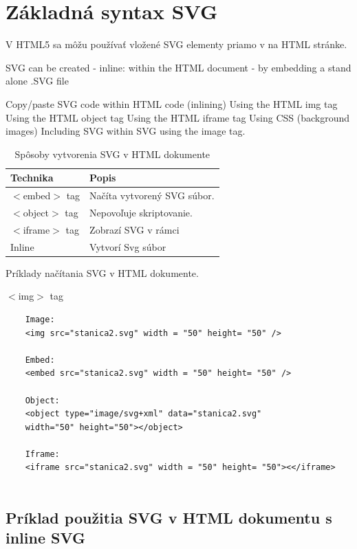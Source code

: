  
 \section{Základná syntax \acs*{SVG}}

V HTML5 sa môžu používať vložené SVG elementy priamo v na HTML stránke. 



SVG can be created 
-   inline: within the HTML document 
-   by embedding a stand alone .SVG file


Copy/paste SVG code within HTML code (inlining)
Using the HTML img tag
Using the HTML object tag
Using the HTML iframe tag
Using CSS (background images)
Including SVG within SVG using the image tag.


\begin{table}[hp]
	\begin{center}
		\begin{tabular}{|l|l|}
			\hline \textbf{Technika} & \textbf{Popis} \\ 
			\hline $<$embed$>$ tag & Načíta vytvorený SVG súbor.  \\ 
			\hline $<$object$>$ tag & Nepovoľuje skriptovanie.  \\ 
			\hline $<$iframe$>$ tag & Zobrazí SVG v rámci  \\ 
			\hline Inline & Vytvorí Svg súbor \\ 
			\hline 
		\end{tabular} 
	\end{center}
	\caption{Spôsoby vytvorenia SVG v HTML dokumente}
	\label{vytvorenie:SVG}
\end{table}

Príklady načítania SVG v HTML dokumente.

$<$img$>$ tag 

\begin{lstlisting}
	Image:
	<img src="stanica2.svg" width = "50" height= "50" />
	
	Embed:
	<embed src="stanica2.svg" width = "50" height= "50" />
	
	Object:
	<object type="image/svg+xml" data="stanica2.svg"
	width="50" height="50"></object>
	
	Iframe:
	<iframe src="stanica2.svg" width = "50" height= "50"><</iframe>
	
\end{lstlisting}






\subsection{Príklad použitia SVG v HTML dokumentu s inline SVG }

